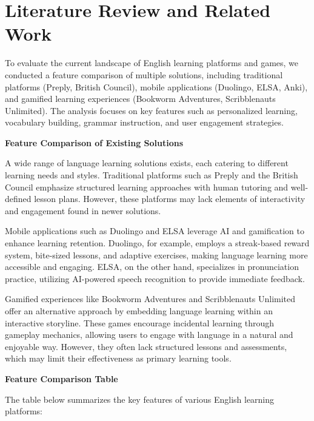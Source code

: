\chapter{Literature Review and Related Work}
\label{chap:relatedworks}

To evaluate the current landscape of English learning platforms and games, we conducted a feature comparison of multiple solutions, including traditional platforms (Preply, British Council), mobile applications (Duolingo, ELSA, Anki), and gamified learning experiences (Bookworm Adventures, Scribblenauts Unlimited). The analysis focuses on key features such as personalized learning, vocabulary building, grammar instruction, and user engagement strategies.

\vspace{1em}
\noindent\textbf{Feature Comparison of Existing Solutions}

\vspace{0.5em}

A wide range of language learning solutions exists, each catering to different learning needs and styles. Traditional platforms such as Preply and the British Council emphasize structured learning approaches with human tutoring and well-defined lesson plans. However, these platforms may lack elements of interactivity and engagement found in newer solutions.

\vspace{1em}

Mobile applications such as Duolingo and ELSA leverage AI and gamification to enhance learning retention. Duolingo, for example, employs a streak-based reward system, bite-sized lessons, and adaptive exercises, making language learning more accessible and engaging. ELSA, on the other hand, specializes in pronunciation practice, utilizing AI-powered speech recognition to provide immediate feedback.

\vspace{1em}

Gamified experiences like Bookworm Adventures and Scribblenauts Unlimited offer an alternative approach by embedding language learning within an interactive storyline. These games encourage incidental learning through gameplay mechanics, allowing users to engage with language in a natural and enjoyable way. However, they often lack structured lessons and assessments, which may limit their effectiveness as primary learning tools.

\vspace{1em}

\noindent\textbf{Feature Comparison Table}

\vspace{1em}

The table below summarizes the key features of various English learning platforms:

\vspace{1em}

